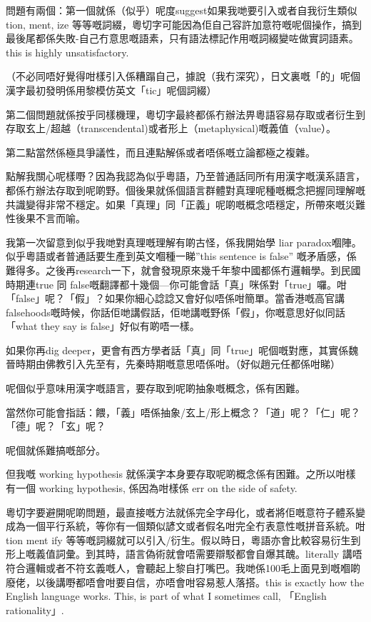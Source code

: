 問題有兩個：第一個就係（似乎）呢度suggest如果我哋要引入或者自我衍生類似 tion, ment, ize 等等嘅詞綴，粵切字可能因為佢自己容許加意符嘅呢個操作，搞到最後尾都係失敗-自己冇意思嘅語素，只有語法標記作用嘅詞綴變咗做實詞語素。this is highly unsatisfactory.

（不必同唔好覺得咁樣引入係糟蹋自己，據說（我冇深究），日文裏嘅「的」呢個漢字最初發明係用黎模仿英文「tic」呢個詞綴）

第二個問題就係按乎同樣機理，粵切字最終都係冇辦法畀粵語容易存取或者衍生到存取玄上/超越（transcendental)或者形上（metaphysical)嘅義值（value）。

第二點當然係極具爭議性，而且連點解係或者唔係嘅立論都極之複雜。

點解我關心呢樣嘢？因為我認為似乎粵語，乃至普通話同所有用漢字嘅漢系語言，都係冇辦法存取到呢啲野。個後果就係個語言群體對真理呢種嘅概念把握同理解嘅共識變得非常不穩定。如果「真理」同「正義」呢啲嘅概念唔穩定，所帶來嘅災難性後果不言而喻。

我第一次留意到似乎我哋對真理嘅理解有啲古怪，係我開始學 liar paradox嗰陣。似乎粵語或者普通話要生產到英文嗰種一睇”this sentence is false” 嘅矛盾感，係難得多。之後再research一下，就會發現原來幾千年黎中國都係冇邏輯學。到民國時期連true 同 false嘅翻譯都十幾個—你可能會話「真」咪係對「true」囉。咁「false」呢？「假」？如果你細心諗諗又會好似唔係咁簡單。當香港嘅高官講 falsehoods嘅時候，你話佢哋講假話，佢哋講嘅野係「假」，你嘅意思好似同話「what they say is false」好似有啲唔一樣。

如果你再dig deeper，更會有西方學者話「真」同「true」呢個嘅對應，其實係魏晉時期由佛教引入先至有，先秦時期嘅意思唔係咁。（好似趙元任都係咁睇）

呢個似乎意味用漢字嘅語言，要存取到呢啲抽象嘅概念，係有困難。

當然你可能會指話：餵，「義」唔係抽象/玄上/形上概念？「道」呢？「仁」呢？「德」呢？「玄」呢？

呢個就係難搞嘅部分。

但我嘅 working hypothesis 就係漢字本身要存取呢啲概念係有困難。之所以咁樣有一個 working hypothesis, 係因為咁樣係 err on the side of safety.

粵切字要避開呢啲問題，最直接嘅方法就係完全字母化，或者將佢嘅意符子體系變成為一個平行系統，等你有一個類似諺文或者假名咁完全冇表意性嘅拼音系統。咁 tion ment ify 等等嘅詞綴就可以引入/衍生。假以時日，粵語亦會比較容易衍生到形上嘅義值詞彙。到其時，語言偽術就會唔需要辯駁都會自爆其醜。literally 講唔符合邏輯或者不符玄義嘅人，會聽起上黎自打嘴巴。我哋係100毛上面見到嘅嗰啲廢佬，以後講嘢都唔會咁要自信，亦唔會咁容易惹人落搭。this is exactly how the English language works. This, is part of what I sometimes call, 「English rationality」.

